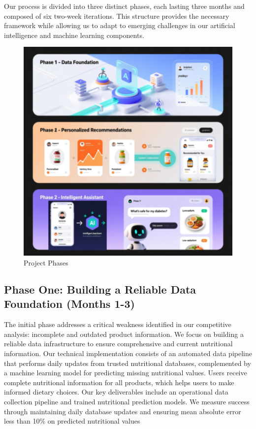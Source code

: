  Our process is divided into three distinct phases, each lasting three months and composed of six two-week iterations.
This structure provides the necessary framework while allowing us to adapt to emerging challenges in our artificial intelligence and machine learning components. 
\begin{figure}[H]
\centering
\includegraphics[scale=0.72]{images/planning.png}
\caption{Project Phases}
\label{fig:project_timeline}
\end{figure}


\subsection{Phase One: Building a Reliable Data Foundation (Months 1-3)}

The initial phase addresses a critical weakness identified in our competitive analysis: incomplete and outdated product information. We focus on building a reliable data infrastructure to ensure comprehensive and current nutritional information. Our technical implementation consists of an automated data pipeline that performs daily updates from trusted nutritional databases, complemented by a machine learning model for predicting missing nutritional values. 
Users receive complete nutritional information for all products, which helps users to make informed dietary choices. Our key deliverables include an operational data collection pipeline and trained nutritional prediction models. We measure success through maintaining daily database updates and ensuring mean absolute error less than 10\% on predicted nutritional values

